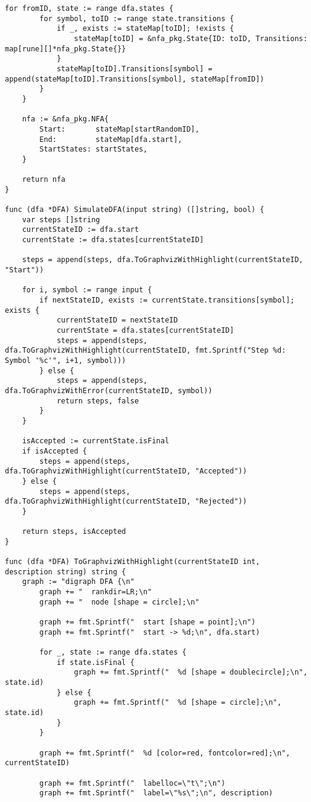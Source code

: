 \begin{appendices}
\begin{lstlisting}[caption=Модуль DFA, extendedchars=\true]
	for fromID, state := range dfa.states {
		for symbol, toID := range state.transitions {
			if _, exists := stateMap[toID]; !exists {
				stateMap[toID] = &nfa_pkg.State{ID: toID, Transitions: map[rune][]*nfa_pkg.State{}}
			}
			stateMap[toID].Transitions[symbol] = append(stateMap[toID].Transitions[symbol], stateMap[fromID])
		}
	}
	
	nfa := &nfa_pkg.NFA{
		Start:       stateMap[startRandomID],
		End:         stateMap[dfa.start],
		StartStates: startStates,
	}
	
	return nfa
}

func (dfa *DFA) SimulateDFA(input string) ([]string, bool) {
	var steps []string
	currentStateID := dfa.start
	currentState := dfa.states[currentStateID]
	
	steps = append(steps, dfa.ToGraphvizWithHighlight(currentStateID, "Start"))
	
	for i, symbol := range input {
		if nextStateID, exists := currentState.transitions[symbol]; exists {
			currentStateID = nextStateID
			currentState = dfa.states[currentStateID]
			steps = append(steps, dfa.ToGraphvizWithHighlight(currentStateID, fmt.Sprintf("Step %d: Symbol '%c'", i+1, symbol)))
		} else {
			steps = append(steps, dfa.ToGraphvizWithError(currentStateID, symbol))
			return steps, false
		}
	}
	
	isAccepted := currentState.isFinal
	if isAccepted {
		steps = append(steps, dfa.ToGraphvizWithHighlight(currentStateID, "Accepted"))
	} else {
		steps = append(steps, dfa.ToGraphvizWithHighlight(currentStateID, "Rejected"))
	}
	
	return steps, isAccepted
}

func (dfa *DFA) ToGraphvizWithHighlight(currentStateID int, description string) string {
	graph := "digraph DFA {\n"
		graph += "  rankdir=LR;\n"
		graph += "  node [shape = circle];\n"
		
		graph += fmt.Sprintf("  start [shape = point];\n")
		graph += fmt.Sprintf("  start -> %d;\n", dfa.start)
		
		for _, state := range dfa.states {
			if state.isFinal {
				graph += fmt.Sprintf("  %d [shape = doublecircle];\n", state.id)
			} else {
				graph += fmt.Sprintf("  %d [shape = circle];\n", state.id)
			}
		}
		
		graph += fmt.Sprintf("  %d [color=red, fontcolor=red];\n", currentStateID)
		
		graph += fmt.Sprintf("  labelloc=\"t\";\n")
		graph += fmt.Sprintf("  label=\"%s\";\n", description)
		

\end{lstlisting}
\end{appendices}
